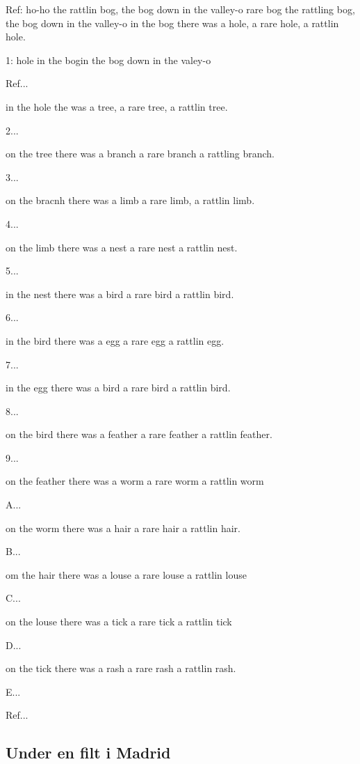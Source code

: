Ref:
ho-ho the rattlin bog, the bog down in the valley-o
rare bog the rattling bog, the bog down in the valley-o
in the bog there was a hole, a rare hole, a rattlin hole.\bigskip

1:
hole in the bogin the bog down in the valey-o

Ref... \bigskip

in the hole the was a tree, a rare tree, a rattlin tree.

2...\bigskip

on the tree there was a branch a rare branch a rattling branch.

3...\bigskip

on the bracnh there was a limb a rare limb, a rattlin limb.

4...\bigskip

on the limb there was a nest a rare nest a rattlin nest.

5...\bigskip

in the nest there was a bird a rare bird a rattlin bird.

6...\bigskip

in the bird there was a egg a rare egg a rattlin egg.

7...\bigskip

in the egg there was a bird a rare bird a rattlin bird.

8...\bigskip

on the bird there was a feather a rare feather a rattlin feather.

9...\bigskip

on the feather there was a worm a rare worm a rattlin worm

A...\bigskip

on the worm there was a hair a rare hair a rattlin hair. 

B...\bigskip

om the hair there was a louse a rare louse a rattlin louse

C...\bigskip

on the louse there was a tick a rare tick a rattlin tick

D...\bigskip

on the tick there was a rash a rare rash a rattlin rash.

E...\bigskip

Ref...\bigskip

\subsection{\textbf{Under en filt i Madrid}}

